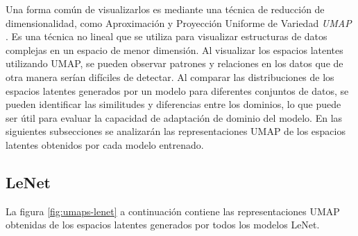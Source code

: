 Una forma común de visualizarlos es mediante una técnica de reducción de dimensionalidad, como Aproximación y
Proyección Uniforme de Variedad {\it UMAP} \parencite{mcinnes2018umap}. Es una técnica no lineal que se utiliza para visualizar estructuras de datos complejas en un
espacio de menor dimensión. Al visualizar los espacios latentes utilizando UMAP, se pueden observar patrones y
relaciones en los datos que de otra manera serían difíciles de detectar. Al comparar las distribuciones de los espacios
latentes generados por un modelo para diferentes conjuntos de datos, se pueden identificar las similitudes y
diferencias entre los dominios, lo que puede ser útil para evaluar la capacidad de adaptación de dominio del modelo. En
las siguientes subsecciones se analizarán las representaciones UMAP de los espacios latentes obtenidos por cada modelo
entrenado.

\newpage
\subsection{LeNet}

La figura \ref{fig:umaps-lenet} a continuación contiene las representaciones UMAP obtenidas de los espacios latentes
generados por todos los modelos LeNet.

